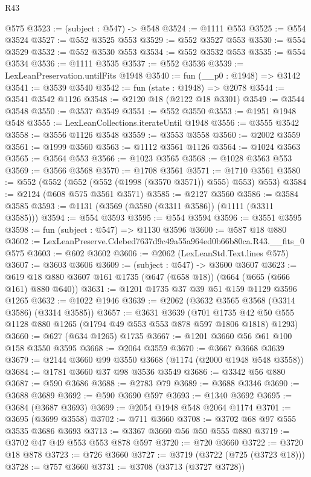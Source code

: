 \begin{lexlean}{R43}
\begin{coremodule}
    @575
@3523 := (subject : @547) -> @548
@3524 := @1111 @553
@3525 := @554 @3524
@3527 := @552 @3525 @553
@3529 := @552 @3527 @553
@3530 := @554 @3529
@3532 := @552 @3530 @553
@3534 := @552 @3532 @553
@3535 := @554 @3534
@3536 := @1111 @3535
@3537 := @552 @3536
@3539 := LexLeanPreservation.untilFits @1948
@3540 := fun (__p0 : @1948) => @3142
@3541 := @3539 @3540
@3542 := fun (state : @1948) => @2078
@3544 := @3541 @3542 @1126
@3548 := @2120 @18 (@2122 @18 @3301)
@3549 := @3544 @3548
@3550 := @3537 @3549
@3551 := @552 @3550
@3553 := @1951 @1948 @548
@3555 := LexLeanCollections.iterateUntil @1948
@3556 := @3555 @3542
@3558 := @3556 @1126 @3548
@3559 := @3553 @3558
@3560 := @2002 @3559
@3561 := @1999 @3560
@3563 := @1112 @3561 @1126
@3564 := @1024 @3563
@3565 := @3564 @553
@3566 := @1023 @3565
@3568 := @1028 @3563 @553
@3569 := @3566 @3568
@3570 := @1708 @3561
@3571 := @1710 @3561
@3580 := @552 (@552 (@552 (@552 (@1998 (@3570 @3571)) @555) @553) @553)
@3584 := @2124 (@608 @575 @3561 @3571)
@3585 := @2127 @3560
@3586 := @3584 @3585
@3593 := @1131 (@3569 (@3580 (@3311 @3586)) (@1111 (@3311 @3585)))
@3594 := @554 @3593
@3595 := @554 @3594
@3596 := @3551 @3595
@3598 := fun (subject : @547) => @1130 @3596
@3600 := @587 @18 @880
@3602 := LexLeanPreserve.Cdebed7637d9c49a55a964ed0b66b80ca.R43.__fits_0 @575
@3603 := @602 @3602
@3606 := @2062 (LexLeanStd.Text.lines @575)
@3607 := @3603 @3606
@3609 := (subject : @547) -> @3600 @3607
@3623 := @619 @18 @880 @3607 @161 @1735 (@647 (@658 @18)) (@664 (@665 (@666 @161) @880 @640))
@3631 := @1201 @1735 @37 @39 @51 @159 @1129 @3596 @1265
@3632 := @1022 @1946
@3639 := @2062 (@3632 @3565 @3568 (@3314 @3586) (@3314 @3585))
@3657 := @3631
    @3639
    (@701 @1735 @42 @50 @555 @1128 @880 @1265 (@1794 @49 @553 @553 @878 @597 @1806 @1818) @1293)
@3660 := @627 (@634 @1265) @1735
@3667 := @1201 @3660 @56 @61 @100 @158 @3550 @3595
@3668 := @2064 @3559
@3670 := @3667 @3668 @3639
@3679 := @2144 @3660 @99 @3550 @3668 (@1174 (@2000 @1948 @548 @3558))
@3684 := @1781 @3660 @37 @98 @3536 @3549
@3686 := @3342 @56 @880
@3687 := @590 @3686
@3688 := @2783 @79
@3689 := @3688 @3346
@3690 := @3688 @3689
@3692 := @590 @3690 @597
@3693 := @1340 @3692
@3695 := @3684 (@3687 @3693)
@3699 := @2054 @1948 @548 @2064 @1174
@3701 := @3695 (@3699 @3558)
@3702 := @711 @3660
@3708 := @3702 @68 @97 @555 @3535 @3686 @3693
@3713 := @3367 @3660 @56 @50 @555 @880
@3719 := @3702 @47 @49 @553 @553 @878 @597
@3720 := @720 @3660
@3722 := @3720 @18 @878
@3723 := @726 @3660
@3727 := @3719 (@3722 (@725 (@3723 @18)))
@3728 := @757 @3660
@3731 := @3708 (@3713 (@3727 @3728))

\end{coremodule}
\end{lexlean}
